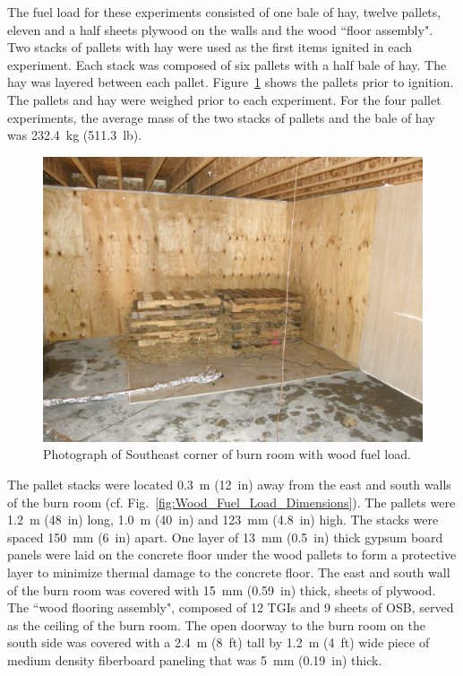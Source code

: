 \documentclass[12pt,oneside]{book}
\begin{document}
The fuel load for these experiments consisted of one bale of hay, twelve pallets, eleven and a half sheets plywood on the walls and the wood ``floor assembly". Two stacks of pallets with hay were used as the first items ignited in each experiment. Each stack was composed of six pallets with a half bale of hay. The hay was layered between each pallet. Figure~\ref{fig:Wood_Fuel_Load} shows the pallets prior to ignition. The pallets and hay were weighed prior to each experiment. For the four pallet experiments, the average mass of the two stacks of pallets and the bale of hay was 232.4~kg (511.3~lb).
\begin{figure}[!ht]
	\includegraphics[width=0.65\columnwidth]{../Figures/Pictures/Wood_Fuel_Package}
	\caption{Photograph of Southeast corner of burn room with wood fuel load.}
	\label{fig:Wood_Fuel_Load}
\end{figure}

The pallet stacks were located 0.3~m (12~in) away from the east and south walls of the burn room (cf. Fig.~\ref{fig:Wood_Fuel_Load_Dimensions}). The pallets were 1.2~m (48~in) long, 1.0~m (40~in) and 123~mm (4.8~in) high. The stacks were spaced 150~mm (6~in) apart. One layer of 13~mm (0.5~in) thick gypsum board panels were laid on the concrete floor under the wood pallets to form a protective layer to minimize thermal damage to the concrete floor. The east and south wall of the burn room was covered with 15~mm (0.59~in) thick, sheets of plywood.  The ``wood flooring assembly", composed of 12 TGIs and 9 sheets of OSB, served as the ceiling of the burn room. The open doorway to the burn room on the south side was covered with a 2.4~m (8~ft) tall by 1.2~m (4~ft) wide piece of medium density fiberboard paneling that was 5~mm (0.19~in) thick.
\end{document}
